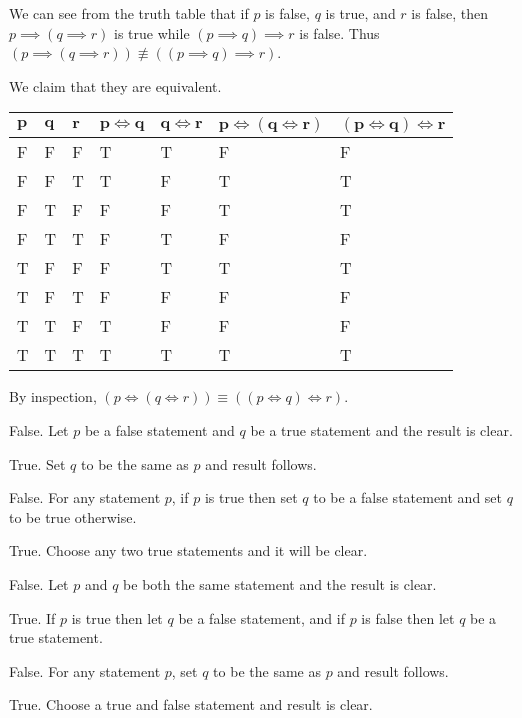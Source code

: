 \begin{questions}
\begin{partquestions}{\alph*}
        We can see from the truth table that if $p$ is false, $q$ is true, and $r$ is false, then $p \implies (q \implies r)$ is true while $(p \implies q) \implies r$ is false. Thus $(p \implies (q \implies r)) \not\equiv ((p \implies q) \implies r)$.

        \item We claim that they are equivalent.
        \begin{table}[H]
            \centering
            \begin{tabular}{|l|l|l||l|l||l|l|}
                \hline
                $\boldsymbol{p}$ & $\boldsymbol{q}$ & $\boldsymbol{r}$ & $\boldsymbol{p \iff q}$ & $\boldsymbol{q \iff r}$ & $\boldsymbol{p \iff (q \iff r)}$ & $\boldsymbol{(p \iff q) \iff r}$ \\ \hline
                F & F & F & T & T & F & F \\ \hline
                F & F & T & T & F & T & T \\ \hline
                F & T & F & F & F & T & T \\ \hline
                F & T & T & F & T & F & F \\ \hline
                T & F & F & F & T & T & T \\ \hline
                T & F & T & F & F & F & F \\ \hline
                T & T & F & T & F & F & F \\ \hline
                T & T & T & T & T & T & T \\ \hline
            \end{tabular}
        \end{table}

        By inspection, $(p \iff (q \iff r)) \equiv ((p \iff q) \iff r)$.
    \end{partquestions}

    \item \begin{partquestions}{\alph*}
        \item False. Let $p$ be a false statement and $q$ be a true statement and the result is clear.
        \item True. Set $q$ to be the same as $p$ and result follows.
        \item False. For any statement $p$, if $p$ is true then set $q$ to be a false statement and set $q$ to be true otherwise.
        \item True. Choose any two true statements and it will be clear.
        \item False. Let $p$ and $q$ be both the same statement and the result is clear.
        \item True. If $p$ is true then let $q$ be a false statement, and if $p$ is false then let $q$ be a true statement.
        \item False. For any statement $p$, set $q$ to be the same as $p$ and result follows.
        \item True. Choose a true and false statement and result is clear.
    \end{partquestions}


\end{questions}
